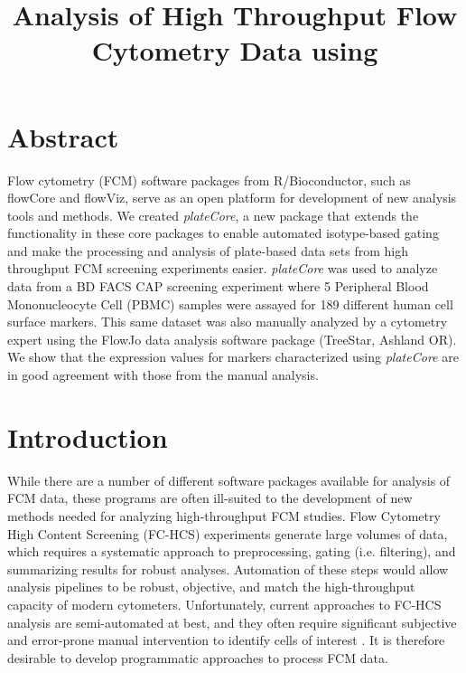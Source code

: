 \documentclass[12pt]{article}
\title{Analysis of High Throughput Flow Cytometry Data using
\Rpackage{plateCore}}
\newcommand{\Rpackage}[1]{{\textit{#1}}}
\begin{document}
\maketitle

\clearpage
\section*{Abstract}
Flow cytometry (FCM) software packages from R/Bioconductor, such as flowCore
and flowViz, serve as an open platform for development of new analysis tools and
methods. We created \Rpackage{plateCore}, a new package that extends the
functionality in these core packages to enable automated isotype-based gating
and make the processing and analysis of plate-based data sets from
high throughput FCM screening experiments easier. \Rpackage{plateCore} was used
to analyze data from a BD FACS CAP screening experiment where 5 Peripheral Blood
Mononucleocyte Cell (PBMC) samples  were assayed for 189 different human cell
surface markers. This same dataset was also manually analyzed by a cytometry
expert using the FlowJo data analysis software package (TreeStar, Ashland OR).
We show that the expression values for markers characterized using
\Rpackage{plateCore} are in good agreement with those from the manual analysis.

\clearpage
\section*{Introduction}

While there are a number of different software packages available for analysis
of FCM data, these programs are often ill-suited to the development of new
methods needed for analyzing high-throughput FCM studies. Flow Cytometry High
Content Screening (FC-HCS) experiments generate large volumes of data,
which requires a systematic approach to preprocessing, gating (i.e. filtering),
and summarizing results for robust analyses. Automation of these steps would
allow analysis pipelines to be robust, objective, and match the high-throughput
capacity of modern cytometers. Unfortunately, current approaches to FC-HCS
analysis are semi-automated at best, and they often require significant
subjective and error-prone manual intervention to identify cells of interest
\citep{Maecker2005}. It is therefore desirable to develop programmatic
approaches to process FCM data.
\end{document}
